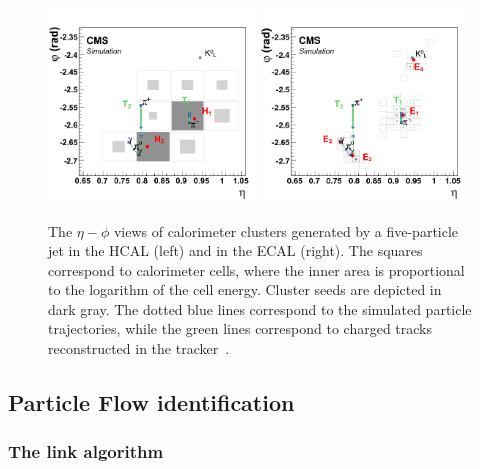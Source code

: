 \begin{figure}[h!] 
    \centering
   \includegraphics[width=0.49\textwidth]{figures/event_reconstruction/PF_HCAL.png}
  \includegraphics[width=0.49\textwidth]{figures/event_reconstruction/PF_ECAL.png}
    \caption{The $\eta-\phi$ views of calorimeter clusters generated by a five-particle jet in the HCAL (left) and in the ECAL (right). The squares correspond to calorimeter cells, where the inner area is proportional to the logarithm of the cell energy. Cluster seeds are depicted in dark gray. The dotted blue lines correspond to the simulated particle trajectories, while the green lines correspond to charged tracks reconstructed in the tracker~\cite{1748-0221-12-10-P10003}.}
    \label{fig:objreco:caloclustering}
\end{figure} 


\subsection{Particle Flow identification}

\subsubsection{The link algorithm}

